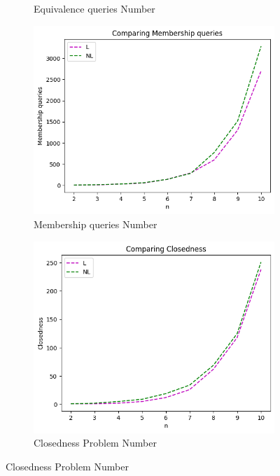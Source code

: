 \begin{figure}[!htb]
\begin{subfigure}[b]{0.3\textwidth}
    \caption{Equivalence queries Number}
    \label{fig:EquivWrostRFSACompare}
  \end{subfigure}
  \begin{subfigure}[b]{0.3\textwidth}
    \includegraphics[width=\textwidth]{../statistics/plots/wrostRFSA/Membership queries.png}
    \caption{Membership queries Number}
    \label{fig:MemberWrostRFSACompare}
  \end{subfigure}
  \begin{subfigure}[b]{0.3\textwidth}
    \includegraphics[width=\textwidth]{../statistics/plots/wrostRFSA/Closedness.png}
    \caption{Closedness Problem Number}

\end{subfigure}
\end{figure}
